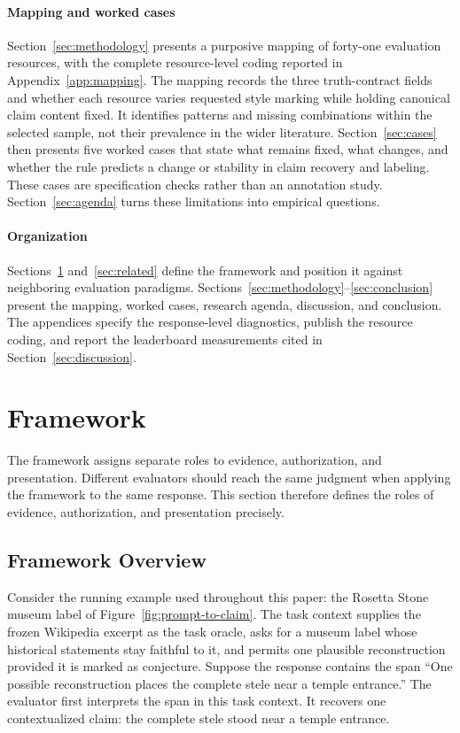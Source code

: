 \documentclass{clv2025}
\begin{document}
\paragraph{Mapping and worked cases}
Section~\ref{sec:methodology} presents a purposive mapping of forty-one
evaluation resources, with the complete resource-level coding reported in
Appendix~\ref{app:mapping}. The mapping records the three truth-contract fields
and whether each resource varies requested style marking while holding
canonical claim content fixed. It identifies patterns and missing combinations
within the selected sample, not their prevalence in the wider literature.
Section~\ref{sec:cases} then presents five worked cases that state what remains
fixed, what changes, and whether the rule predicts a change or stability in
claim recovery and labeling. These cases are specification checks rather than
an annotation study. Section~\ref{sec:agenda} turns these limitations into
empirical questions.

\paragraph{Organization}
Sections~\ref{sec:framework} and~\ref{sec:related} define the framework and
position it against neighboring evaluation paradigms.
Sections~\ref{sec:methodology}--\ref{sec:conclusion} present the mapping,
worked cases, research agenda, discussion, and conclusion. The appendices
specify the response-level diagnostics, publish the resource coding, and report
the leaderboard measurements cited in Section~\ref{sec:discussion}.

\section{Framework}\label{sec:framework}

The framework assigns separate roles to evidence, authorization, and
presentation. Different evaluators should reach the same judgment when applying the framework to the same response. This section therefore defines the roles of evidence, authorization, and presentation precisely.


\subsection{Framework Overview}

Consider the running example used throughout this paper: the Rosetta Stone
museum label of Figure~\ref{fig:prompt-to-claim}.
The task context supplies the frozen Wikipedia excerpt as the task oracle, asks
for a museum label whose historical statements stay faithful to it, and permits
one plausible reconstruction provided it is marked as conjecture.
Suppose the response contains the span ``One possible reconstruction places the
complete stele near a temple entrance.''
The evaluator first interprets the span in this task context. It recovers one
contextualized claim: the complete stele stood near a temple entrance.
\end{document}
